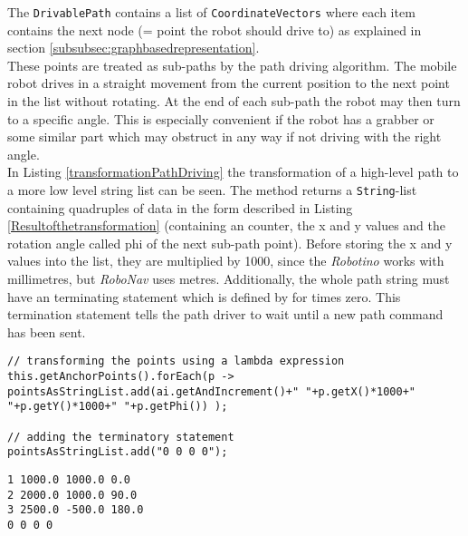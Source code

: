 The \texttt{DrivablePath} contains a list of \texttt{CoordinateVectors} where each item contains the next node (= point the robot should drive to) as explained in section \ref{subsubsec:graphbasedrepresentation}. \\
These points are treated as sub-paths by the path driving algorithm. The mobile robot drives in a straight movement from the current position to the next point in the list without rotating. At the end of each sub-path the robot may then turn to a specific angle. This is especially convenient if the robot has a grabber or some similar part which may obstruct in any way if not driving with the right angle. \\ In Listing \ref{transformationPathDriving} the transformation of a high-level path to a more low level string list can be seen. The method returns a \texttt{String}-list containing quadruples of data in the form described in Listing   \ref{Resultofthetransformation} (containing an counter, the x and y values and the rotation angle called phi of the next sub-path point). Before storing the x and y values into the list, they are multiplied by 1000, since the \textit{Robotino} works with millimetres, but \textit{RoboNav} uses metres. Additionally, the whole path string must have an terminating statement which is defined by for times zero. This termination statement tells the path driver to wait until a new path command has been sent. 
\begin{lstlisting}[caption = Simplified transformation logic, label = transformationPathDriving]
// transforming the points using a lambda expression
this.getAnchorPoints().forEach(p -> pointsAsStringList.add(ai.getAndIncrement()+" "+p.getX()*1000+" "+p.getY()*1000+" "+p.getPhi()) );
    
// adding the terminatory statement
pointsAsStringList.add("0 0 0 0");
\end{lstlisting}
\begin{lstlisting}[caption = Result of the transformation, label = Resultofthetransformation]
1 1000.0 1000.0 0.0
2 2000.0 1000.0 90.0
3 2500.0 -500.0 180.0
0 0 0 0
\end{lstlisting}
